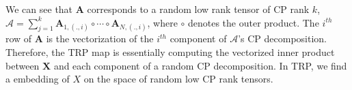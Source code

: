 We can see that $\mathbf{A}$ corresponds to a random low rank tensor of CP rank $k$, $\mathscr{A} = \sum_{j = 1}^k \mathbf{A}_{1,(.,i)} \circ \cdots \circ \mathbf{A}_{N, (.,i)}$, %
where $\circ$ denotes the outer product. The $i^{th}$ row of $\mathbf{A}$ is the vectorization of the $i^{th}$ component of $\mathscr{A}$'s CP decomposition. Therefore, the TRP map is essentially computing the vectorized inner product between $\mathbf{X}$ and each component of a random CP decomposition. In TRP, we find a embedding of $X$ on the space of random low CP rank tensors. 